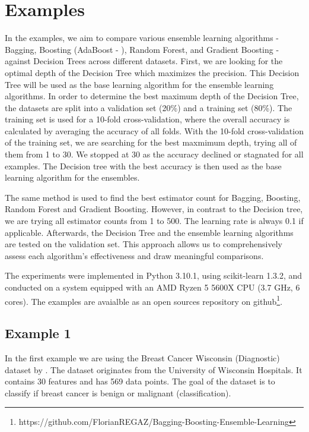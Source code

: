 \section{Examples}
In the examples, we aim to compare various ensemble learning algorithms - Bagging, 
Boosting (AdaBoost - \citet{freund1996experiments}), Random Forest, and Gradient 
Boosting - against Decision Trees across different datasets.
First, we are looking for the optimal depth of the Decision Tree which maximizes the 
precision. This Decision Tree will be used as the base learning algorithm for 
the ensemble learning algorithms.
In order to determine the best maximum depth of the Decision Tree, the datasets are 
split into a validation set (20\%) and a training set (80\%). The training set is used
for a 10-fold cross-validation, where the overall accuracy is calculated by averaging the 
accuracy of all folds. With the 10-fold cross-validation of the training set, we are
searching for the best maxmimum depth, trying all of them from 1 to 30. We stopped at
30 as the accuracy declined or stagnated for all examples. The Decision tree with the
best accuracy is then used as the base learning algorithm for the ensembles.

The same method is used to find the best estimator count for Bagging, Boosting, 
Random Forest and Gradient Boosting. However, in contrast to the Decision tree,
we are trying all estimator counts from 1 to 500.
The learning rate is always 0.1 if applicable. Afterwards, the Decision Tree and
the ensemble learning algorithms are tested on the validation set.
This approach allows us to comprehensively assess each algorithm's effectiveness
and draw meaningful comparisons.


The experiments were implemented in Python 3.10.1, using scikit-learn 1.3.2, and
conducted on a system equipped with an AMD Ryzen 5 5600X CPU (3.7 GHz, 6 cores).
The examples are avaialble as an open sources repository on github\footnote[1]{https://github.com/FlorianREGAZ/Bagging-Boosting-Ensemble-Learning}.

\newpage %
\subsection{Example 1}
\label{sec:example1}

In the first example we are using the Breast Cancer Wisconsin (Diagnostic)
dataset by \citet*{breast_cancer_wisconsin}. The dataset originates from
the University of Wisconsin Hospitals. It contains 30 features and has 569
data points. The goal of the dataset is to classify if breast cancer
is benign or malignant (classification).

